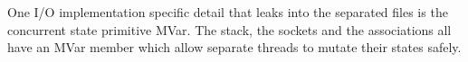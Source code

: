 One I/O implementation specific detail that leaks into the separated files is the concurrent state primitive MVar. The stack, the sockets and the associations all have an MVar member which allow separate threads to mutate their states safely.


